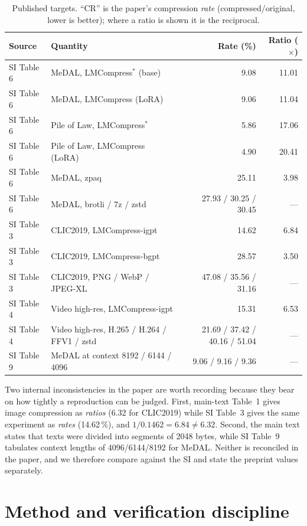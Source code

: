 \documentclass[11pt,a4paper]{article}
\begin{document}
\begin{table}[htbp]
\centering
\small
\caption{Published targets. ``CR'' is the paper's compression \emph{rate}
(compressed/original, lower is better); where a ratio is shown it is the
reciprocal.}
\label{tab:targets}
\begin{tabular}{llrr}
\toprule
Source & Quantity & Rate (\%) & Ratio ($\times$) \\
\midrule
SI Table 6 & MeDAL, LMCompress$^{*}$ (base) & 9.08 & 11.01 \\
SI Table 6 & MeDAL, LMCompress (LoRA) & 9.06 & 11.04 \\
SI Table 6 & Pile of Law, LMCompress$^{*}$ & 5.86 & 17.06 \\
SI Table 6 & Pile of Law, LMCompress (LoRA) & 4.90 & 20.41 \\
SI Table 6 & MeDAL, zpaq & 25.11 & 3.98 \\
SI Table 6 & MeDAL, brotli / 7z / zstd & 27.93 / 30.25 / 30.45 & --- \\
SI Table 3 & CLIC2019, LMCompress-igpt & 14.62 & 6.84 \\
SI Table 3 & CLIC2019, LMCompress-bgpt & 28.57 & 3.50 \\
SI Table 3 & CLIC2019, PNG / WebP / JPEG-XL & 47.08 / 35.56 / 31.16 & --- \\
SI Table 4 & Video high-res, LMCompress-igpt & 15.31 & 6.53 \\
SI Table 4 & Video high-res, H.265 / H.264 / FFV1 / zstd & 21.69 / 37.42 / 40.16 / 51.04 & --- \\
SI Table 9 & MeDAL at context 8192 / 6144 / 4096 & 9.06 / 9.16 / 9.36 & --- \\
\bottomrule
\end{tabular}
\end{table}

Two internal inconsistencies in the paper are worth recording because they bear
on how tightly a reproduction can be judged. First, main-text Table~1 gives image
compression as \emph{ratios} (6.32 for CLIC2019) while SI Table~3 gives the same
experiment as \emph{rates} (14.62\,\%), and $1/0.1462 = 6.84 \neq 6.32$. Second,
the main text states that texts were divided into segments of \num{2048} bytes,
while SI Table~9 tabulates context lengths of 4096/6144/8192 for MeDAL. Neither
is reconciled in the paper, and we therefore compare against the SI and state the
preprint values separately.

\section{Method and verification discipline}
\label{ch:method}
\end{document}
